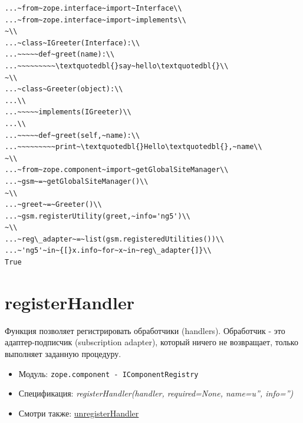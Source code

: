 \documentclass[a4paper,openany,twoside,draft]{book}
\providecommand*{\DUroletitlereference}[1]{\textsl{#1}}
\begin{document}
\begin{verbatim}
...~from~zope.interface~import~Interface\\
...~from~zope.interface~import~implements\\
~\\
...~class~IGreeter(Interface):\\
...~~~~~def~greet(name):\\
...~~~~~~~~~\textquotedbl{}say~hello\textquotedbl{}\\
~\\
...~class~Greeter(object):\\
...\\
...~~~~~implements(IGreeter)\\
...\\
...~~~~~def~greet(self,~name):\\
...~~~~~~~~~print~\textquotedbl{}Hello\textquotedbl{},~name\\
~\\
...~from~zope.component~import~getGlobalSiteManager\\
...~gsm~=~getGlobalSiteManager()\\
~\\
...~greet~=~Greeter()\\
...~gsm.registerUtility(greet,~info='ng5')\\
~\\
...~reg\_adapter~=~list(gsm.registeredUtilities())\\
...~'ng5'~in~{[}x.info~for~x~in~reg\_adapter{]}\\
True
\end{verbatim}


\section*{registerHandler%
  \label{registerhandler}%
}

Функция позволяет регистрировать обработчики (handlers). Обработчик -
это адаптер-подписчик (subscription adapter), который ничего не
возвращает, только выполняет заданную процедуру.

\begin{itemize}

\item Модуль: \texttt{zope.component - IComponentRegistry}

\item Спецификация: \DUroletitlereference{registerHandler(handler, required=None, name=u'', info='')}

\item Смотри также: \hyperref[unregisterhandler]{unregisterHandler}

\end{itemize}
\end{document}
